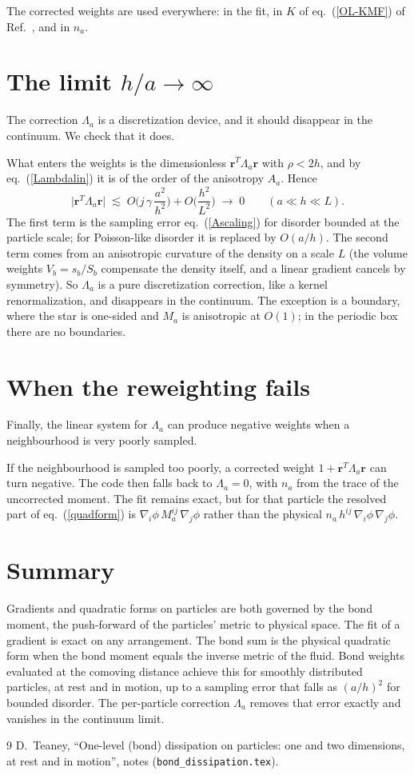 \documentclass[11pt,aps,preprint,nofootinbib,superscriptaddress,tightenlines]{revtex4-2}
\def\st{\begin{equation}}
\def\stp{\end{equation}}
\def\Eq#1{eq.~(\ref{#1})}
\newcommand{\EqOL}[1]{eq.~(\ref{OL-#1}) of Ref.~\cite{OneLevel}}
\begin{document}
The corrected weights are used everywhere: in the fit, in $K$ of \EqOL{KMF}, and in
$n_a$.

\section{The limit $h/a\to\infty$}
\label{sec:limit}

The correction $\Lambda_a$ is a discretization device, and it should disappear
in the continuum.  We check that it does.

What enters the weights is the dimensionless $\bm r^T\Lambda_a\bm r$ with $\rho<2h$,
and by \Eq{Lambdalin} it is of the order of the anisotropy $A_a$.  Hence
\st
\big|\bm r^T\Lambda_a\bm r\big|\;\lesssim\;O\Big(j\,\gamma\,\frac{a^2}{h^2}\Big)+O\Big(\frac{h^2}{L^2}\Big)\;\longrightarrow\;0
\qquad(a\ll h\ll L).
\label{Lambdalimit}
\stp
The first term is the sampling error \Eq{Ascaling} for disorder bounded at the
particle scale; for Poisson-like disorder it is replaced by $O(a/h)$.  The second term comes
from an anisotropic curvature of the density on a scale $L$ (the volume weights
$V_b=s_b/S_b$ compensate the density itself, and a linear gradient cancels by
symmetry).  So $\Lambda_a$ is a pure discretization correction, like a kernel
renormalization, and disappears in the continuum.  The exception is a boundary,
where the star is one-sided and $M_a$ is anisotropic at $O(1)$; in the periodic
box there are no boundaries.

\section{When the reweighting fails}
\label{sec:fail}

Finally, the linear system for $\Lambda_a$ can produce negative weights when a
neighbourhood is very poorly sampled.

If the neighbourhood is sampled too poorly, a corrected weight
$1+\bm r^T\Lambda_a\bm r$ can turn negative.  The code then falls back to
$\Lambda_a=0$, with $n_a$ from the trace of the uncorrected moment.  The fit remains exact, but for
that particle the resolved part of \Eq{quadform} is $\nabla_i\phi\,M_a^{ij}\,\nabla_j\phi$ rather than
the physical $n_a\,h^{ij}\,\nabla_i\phi\,\nabla_j\phi$.


\section{Summary}

Gradients and quadratic forms on particles are both governed by the bond
moment, the push-forward of the particles' metric to physical space.  The fit
of a gradient is exact on any arrangement.  The bond sum is the physical
quadratic form when the bond moment equals the inverse metric of the fluid.  Bond
weights evaluated at the comoving distance achieve this for smoothly
distributed particles, at rest and in motion, up to a sampling error that falls
as $(a/h)^2$ for bounded disorder.  The per-particle correction $\Lambda_a$ removes
that error exactly and vanishes in the continuum limit.

\begin{thebibliography}{9}
 D.~Teaney, ``One-level (bond) dissipation on particles: one
and two dimensions, at rest and in motion'', notes (\texttt{bond\_dissipation.tex}).
\end{thebibliography}
\end{document}
